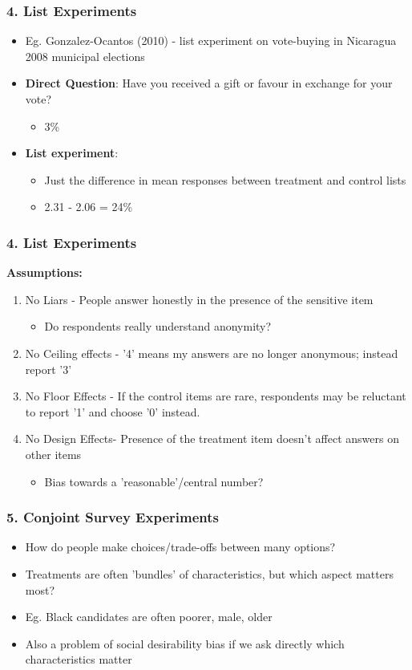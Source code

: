 \documentclass[xcolor=x11names,compress]{beamer}\usepackage[]{graphicx}\usepackage[]{color}
\renewcommand{\(}{\begin{columns}}
\renewcommand{\)}{\end{columns}}
\newcommand{\<}[1]{\begin{column}{#1}}
\renewcommand{\>}{\end{column}}
\begin{document}
\begin{frame}
\frametitle{4. List Experiments}
\begin{itemize}
\item Eg. Gonzalez-Ocantos (2010) - list experiment on vote-buying in Nicaragua 2008 municipal elections
\item \textbf{Direct Question}: Have you received a gift or favour in exchange for your vote?
\begin{itemize}
\item 3\%
\pause
\end{itemize}
\item \textbf{List experiment}:
\begin{itemize}
\item Just the difference in mean responses between treatment and control lists
\item 2.31 - 2.06 = 24\%
\end{itemize}
\end{itemize}
\end{frame}

\begin{frame}
\frametitle{4. List Experiments}
\textbf{Assumptions:}
\begin{enumerate}
\item No Liars - People answer honestly in the presence of the sensitive item
\pause
\begin{itemize}
\item Do respondents really understand anonymity?
\end{itemize}
\pause
\item No Ceiling effects - '4' means my answers are no longer anonymous; instead report '3'
\pause
\item No Floor Effects - If the control items are rare, respondents may be reluctant to report '1' and choose '0' instead.
\pause
\item No Design Effects- Presence of the treatment item doesn't affect answers on other items
\begin{itemize}
\item Bias towards a 'reasonable'/central number?
\end{itemize}
\end{enumerate}
\end{frame}

\begin{frame}
\frametitle{5. Conjoint Survey Experiments}
\begin{itemize}
\item How do people make choices/trade-offs between many options?
\pause
\item Treatments are often 'bundles' of characteristics, but which aspect matters most?
\pause
\item Eg. Black candidates are often poorer, male, older
\pause
\item Also a problem of social desirability bias if we ask directly which characteristics matter
\end{itemize}
\end{frame}
\end{document}
